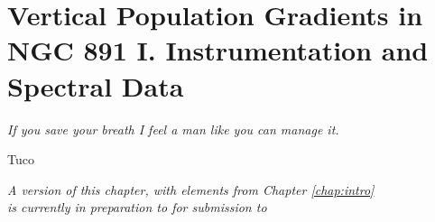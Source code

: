 


\chapter[NGC 891: Observations and spectral data]{Vertical Population
  Gradients in NGC 891 I. Instrumentation and Spectral Data}
\label{chap:891_1}
\epigraph{\fixspacing\emph{If you save your breath I feel a man like you can manage it.}}{Tuco}

\vfill
\begin{flushright}
  \fixspacing
  \textit{A version of this chapter, with elements from Chapter \ref{chap:intro}\\
    is currently in preparation to for submission to \apj}
\end{flushright}
\vspace{1in}
\cleardoublepage


